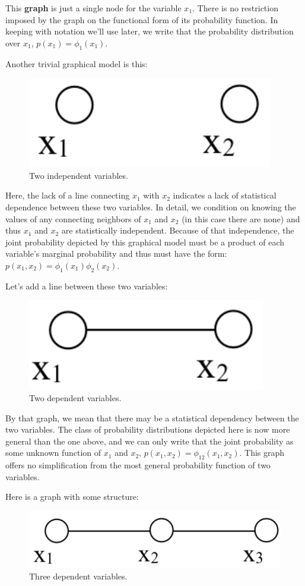 This {\bf graph}
is just a single node for the variable $x_1$.  There is no restriction
imposed by the graph on the functional form of its probability function.
In keeping with notation we'll use later, we write that the
probability distribution over $x_1$, $p(x_1) = \phi_1(x_1)$.

Another trivial graphical model is this:
\begin{figure}
\centerline{\includegraphics[width=0.2\linewidth]{figures/graphical_models/x1x2.pdf}} 
\caption{Two independent variables.}
\end{figure}

Here, the lack of a
line connecting $x_1$ with $x_2$ indicates a lack of statistical
dependence between these two variables.  In detail, we condition on knowing the
values of any connecting neighbors of $x_1$ and $x_2$ (in this case there
are none) and thus $x_1$ and $x_2$ are statistically independent.  Because of
that independence, the joint probability depicted by this graphical
model must be a product of each variable's marginal probability and thus
must have the form:  $p(x_1, x_2) = \phi_1(x_1) \phi_2(x_2) $.

Let's add a line between these two variables:
\begin{figure}
\centerline{\includegraphics[width=0.16\linewidth]{figures/graphical_models/x1bx2.pdf}} 
\caption{Two dependent variables.}
\end{figure}

By that graph, we
mean that there may be a statistical dependency between
the two variables.  The class of probability
distributions depicted here is now more general than the one above, and we can
only write that the joint probability as some unknown function of
$x_1$ and $x_2$, $p(x_1, x_2) = \phi_{12}(x_1, x_2)$.  This graph
offers no simplification from the most general probability function of
two variables.

Here is a graph with some structure:
\begin{figure}
\centerline{\includegraphics[width=0.24\linewidth]{figures/graphical_models/x1bx2bx3.pdf}} 
\caption{Three dependent variables.}
\label{graph:3node}
\end{figure}

